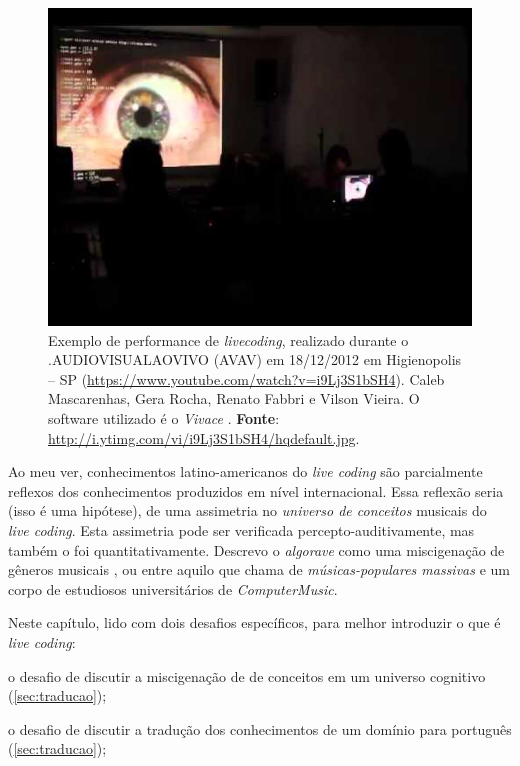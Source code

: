 \begin{figure}[!h]
\begin{center}
\includegraphics[scale=0.71]{./imagens/vivace_performance.jpg}
\caption{Exemplo de performance de \textit{livecoding}, realizado durante o .AUDIOVISUALAOVIVO (AVAV) em 18/12/2012 em Higienopolis -- SP (\url{https://www.youtube.com/watch?v=i9Lj3S1bSH4}). Caleb Mascarenhas, Gera Rocha, Renato Fabbri e Vilson Vieira.  O software utilizado é o \textit{Vivace} \cite{vieira_vivace:_2015}. \textbf{Fonte}: \url{http://i.ytimg.com/vi/i9Lj3S1bSH4/hqdefault.jpg}.}
\label{fig:vivace_performance}
\end{center}
\end{figure}

Ao meu ver, conhecimentos latino-americanos do \emph{live coding} são parcialmente reflexos dos conhecimentos produzidos em nível internacional. Essa reflexão seria (isso é uma hipótese), de uma assimetria no \emph{universo de conceitos} musicais do \emph{live coding}. Esta assimetria pode ser verificada percepto-auditivamente, mas também o foi quantitativamente. Descrevo o \emph{algorave} como uma miscigenação de gêneros musicais , ou entre aquilo que  chama de \emph{músicas-populares massivas} e um corpo de estudiosos universitários de \emph{ComputerMusic}.

Neste capítulo, lido com dois desafios específicos, para melhor introduzir o que é \emph{live coding}: \begin{inparaenum}
\item o desafio de discutir a miscigenação de de conceitos em um universo cognitivo (\autoref{sec:traducao});
\item o desafio de discutir a tradução dos conhecimentos de um domínio para português (\autoref{sec:traducao});

\end{inparaenum}

